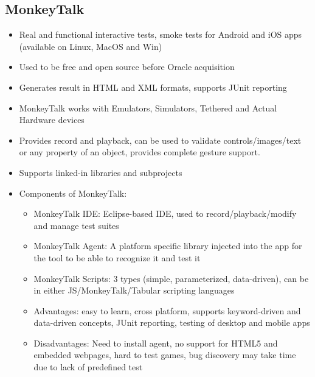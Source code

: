 \documentclass{article}
\begin{document}
\subsection{MonkeyTalk}
\begin{itemize}
    \item Real and functional interactive tests, smoke tests for Android and iOS apps (available on Linux, MacOS and Win)
    
    \item Used to be free and open source before Oracle acquisition
    
    \item Generates result in HTML and XML formats, supports JUnit reporting
    
    \item MonkeyTalk works	with Emulators,	Simulators, Tethered and Actual Hardware devices
    
    \item Provides record and playback, can	be	used	to	validate	controls/images/text	or  any property of an object, provides complete gesture support.
    
    \item Supports linked-in libraries and subprojects
    
    \item Components of MonkeyTalk:
    \begin{itemize}
        \item MonkeyTalk IDE: Eclipse-based IDE, used to record/playback/modify and manage test suites
        
        \item MonkeyTalk Agent: A platform specific library injected into the app for the tool to be able to recognize it and test it
        
        \item MonkeyTalk Scripts: 3 types (simple, parameterized, data-driven), can be in either JS/MonkeyTalk/Tabular scripting languages
        
        \item Advantages: easy to learn, cross platform, supports keyword-driven and data-driven concepts, JUnit reporting, testing of desktop and mobile apps
        
        \item Disadvantages: Need to install agent, no support for HTML5 and embedded webpages, hard to test games, bug discovery may take time due to lack of predefined test
    \end{itemize}
\end{itemize}
\end{document}
